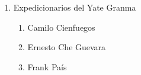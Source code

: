 \documentclass[twocolumn]{article}
\begin{document}
\begin{enumerate}
\begin{enumerate}
  \end{enumerate}



  \item Expedicionarios del Yate Granma

  \begin{enumerate}
   
   \item Camilo Cienfuegos
   
   \item Ernesto Che Guevara
   
   \item Frank País
   
  \end{enumerate}


\end{enumerate}


\end{document}
